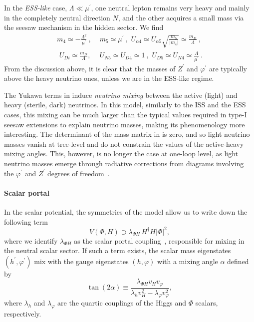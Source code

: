 In the \textit{ESS-like} case, $\Lambda \ll \mu^\prime$, one neutral lepton remains very heavy and mainly in the completely neutral direction $N$, and the other acquires a small mass via the seesaw mechanism in the hidden sector. We find
%
\begin{align}
m_4 \simeq -\frac{ \Lambda^2}{\mu^\prime}~, & \,\,  m_5 \simeq \mu^\prime ~, \,\, U_{\alpha 4} \simeq U_{\alpha 5}\sqrt{\frac{m_5}{\left|m_4\right|}}  \simeq  \frac{m_D}{\Lambda}~,\nonumber \\ \,\, U_{D i} \simeq \frac{m_D}{\Lambda},  &\,\,  U_{N5} \simeq U_{D4} \simeq 1 ~, \,\,  U_{D5} \simeq U_{N4} \simeq \frac{\Lambda}{\mu^\prime} ~.\nonumber
\end{align}
%
From the discussion above, it is clear that the masses of $Z^\prime$ and $\varphi^\prime$ are typically above the heavy neutrino ones, unless we are in the ESS-like regime.

The Yukawa terms in  induce {\em neutrino mixing} between the active (light) and heavy (sterile, dark) neutrinos. In this model, similarly to the ISS and the ESS cases, this mixing can be much larger than the typical values required in type-I seesaw extensions to explain neutrino masses, making its phenomenology more interesting. The determinant of the mass matrix in  is zero, and so light neutrino masses vanish at tree-level and do not constrain the values of the active-heavy mixing angles. This, however, is no longer the case at one-loop level, as light neutrino masses emerge through radiative corrections from diagrams involving the $\varphi^\prime$ and $Z^\prime$ degrees of freedom~\cite{Ballett:2019cqp}.  


\paragraph{Scalar portal}
In the scalar potential, the symmetries of the model allow us to write down the following term
\begin{equation}
    V(\Phi,H) \supset \lambda_{\Phi H} \, H^\dagger H \left| \Phi\right|^2,
\end{equation}
where we identify $\lambda_{\Phi H}$ as the scalar portal coupling~\cite{Barger:2008jx}, responsible for mixing in the neutral scalar sector. If such a term exists, the scalar mass eigenstates $(h^\prime, \varphi^\prime)$ mix with the gauge eigenstates $(h, \varphi)$ 
with a mixing angle $\alpha$ defined by 
%
\begin{equation}
\tan{(2\alpha)} \equiv \frac{\lambda_{\Phi H} v_{H} v_\varphi}{\lambda_h v_{H}^2 - \lambda_\varphi v_\varphi^2},
\end{equation}
%
where $\lambda_h$ and $\lambda_\varphi$ are the quartic couplings of the Higgs and $\Phi$ scalars, respectively. 


